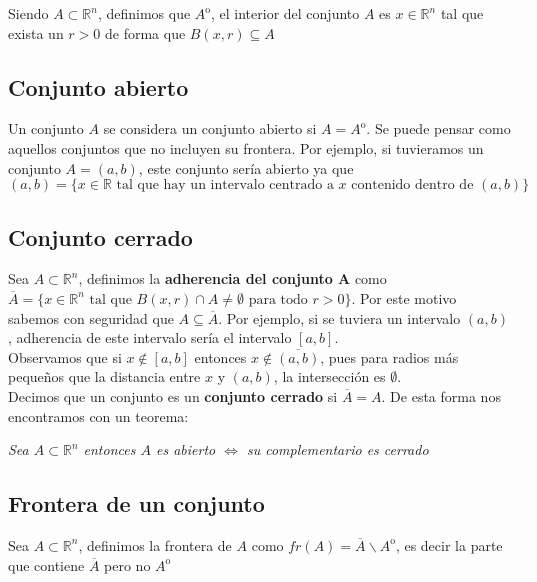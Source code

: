 \documentclass[11pt]{article}
\newcommand{\R}{\mathbb{R}}
\theoremstyle{plain}
\begin{document}
            Siendo $A \subset \R^n$, definimos que $A^{\mathrm{o}}$, el interior del conjunto $A$ es $x\in \R^n$ tal que exista un $r>0$ de forma que $B(x,r) \subseteq A$
        \subsection{Conjunto abierto} %
        \label{sub:conjunto_abierto}
            Un conjunto $A$ se considera un conjunto abierto si $ A = A^{\mathrm{o}}$. Se puede pensar como aquellos conjuntos que no incluyen su frontera. Por ejemplo, si tuvieramos un conjunto $A = (a,b)$, este conjunto sería abierto ya que $(a,b) = \{ x \in \R \text{ tal que hay un intervalo centrado a $x$ contenido dentro de $(a,b)$}\}$  
        \subsection{Conjunto cerrado} %
        \label{sub:conjunto_cerrado}
            Sea $A \subset \R ^n$, definimos la \textbf{adherencia del conjunto A} como $\overline{A} = \{x\in \R^n \text{ tal que } B(x,r)\cap A \ne \emptyset \text{ para todo } r>0\}$. Por este motivo sabemos con seguridad que $A \subseteq \overline{A}$. Por ejemplo, si se tuviera un intervalo $(a,b)$, adherencia de este intervalo sería el intervalo $[a,b]$.\\

            Observamos que si $x \notin [a,b]$ entonces $x \notin \overline{(a,b)}$, pues para radios más pequeños que la distancia entre $x$ y $(a,b)$, la intersección es $\emptyset$.\\

            Decimos que un conjunto es un \textbf{conjunto cerrado} si $\overline{A} = A$. De esta forma nos encontramos con un teorema:
            \begin{center}
                \textit{Sea $A \subset \R^n$ entonces $A$ es abierto $\Leftrightarrow$ su complementario es cerrado}
            \end{center}
        \subsection{Frontera de un conjunto} %
        \label{sub:frontera_de_un_conjunto}
            Sea $A \subset \R^n$, definimos la frontera de $A$ como $fr(A) = \overline{A} \backslash  A^{\mathrm{o}}$, es decir la parte que contiene $\overline{A}$ pero no $A^{\mathrm{o}}$
\end{document}
